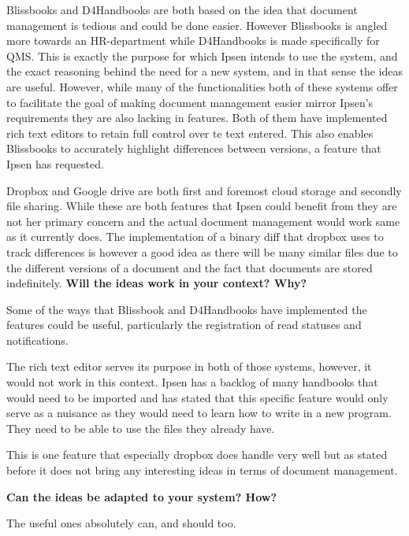 Blissbooks and D4Handbooks are both based on the idea that document management is tedious and could be done easier.
However Blissbooks is angled more towards an HR-department while D4Handbooks is made specifically for QMS.
This is exactly the purpose for which Ipsen intends to use the system, and the exact reasoning behind the need for a new system, and in that sense the ideas are useful.
However, while many of the functionalities both of these systems offer to facilitate the goal of making document management easier mirror Ipsen's requirements they are also lacking in features.
Both of them have implemented rich text editors to retain full control over te text entered. 
This also enables Blissbooks to accurately highlight differences between versions, a feature that Ipsen has requested.

Dropbox and Google drive are both first and foremost cloud storage and secondly file sharing. 
While these are both features that Ipsen could benefit from they are not her primary concern and the actual document management would work same as it currently does.
The implementation of a binary diff that dropbox uses to track differences is however a good idea as there will be many similar files due to the different versions of a document and the fact that documents are stored indefinitely.
\textbf{Will the ideas work in your context? Why?}

Some of the ways that Blissbook and D4Handbooks have implemented the features could be useful, particularly the registration of read statuses and notifications.

The rich text editor serves its purpose in both of those systems, however, it would not work in this context.
Ipsen has a backlog of many handbooks that would need to be imported and has stated that this specific feature would only serve as a nuisance as they would need to learn how to write in a new program.
They need to be able to use the files they already have.

This is one feature that especially dropbox does handle very well but as stated before it does not bring any interesting ideas in terms of document management.

\textbf{Can the ideas be adapted to your system? How?}

The useful ones absolutely can, and should too.
